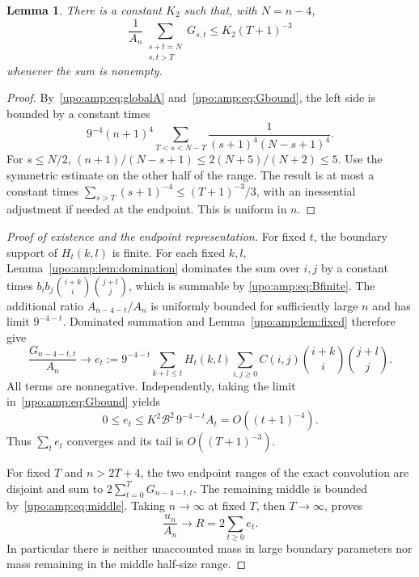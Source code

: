 \documentclass[11pt,letterpaper]{article}
\newtheorem{lemma}[theorem]{Lemma}
\theoremstyle{remark}\newtheorem{remark}[theorem]{Remark}
\numberwithin{equation}{section}
\begin{document}
\begin{lemma}\label{upo:amp:lem:middle}
There is a constant $K_2$ such that, with $N=n-4$,
\begin{equation}\label{upo:amp:eq:middle}
\frac1{A_n}\sum_{\substack{s+t=N\\s,t>T}}G_{s,t}
\le K_2(T+1)^{-3}
\end{equation}
whenever the sum is nonempty.
\end{lemma}
\begin{proof}
By~\eqref{upo:amp:eq:globalA} and~\eqref{upo:amp:eq:Gbound}, the left side is bounded
by a constant times
\[
9^{-4}(n+1)^4\sum_{T<s<N-T}
\frac1{(s+1)^4(N-s+1)^4}.
\]
For $s\le N/2$, $(n+1)/(N-s+1)\le2(N+5)/(N+2)\le5$.
Use the symmetric estimate on the other half of the range. The result
is at most a constant times
$\sum_{s>T}(s+1)^{-4}\le (T+1)^{-3}/3$, with an inessential adjustment
if needed at the endpoint. This is uniform in $n$.
\end{proof}

\begin{proof}[Proof of existence and the endpoint representation]
For fixed $t$, the boundary support of $H_t(k,l)$ is finite. For each
fixed $k,l$, Lemma~\ref{upo:amp:lem:domination} dominates the sum over $i,j$ by
a constant times
$b_ib_j\binom{i+k}{i}\binom{j+l}{j}$, which is summable by
\eqref{upo:amp:eq:Bfinite}. The additional ratio $A_{n-4-t}/A_n$ is uniformly
bounded for sufficiently large $n$ and has limit $9^{-4-t}$.
Dominated summation and Lemma~\ref{upo:amp:lem:fixed} therefore give
\begin{equation}\label{upo:amp:eq:et}
\frac{G_{n-4-t,t}}{A_n}\longrightarrow e_t:=
9^{-4-t}\sum_{k+l\le t}H_t(k,l)
\sum_{i,j\ge0}C(i,j)\binom{i+k}{i}\binom{j+l}{j}.
\end{equation}
All terms are nonnegative. Independently, taking the limit
in~\eqref{upo:amp:eq:Gbound} yields
\[
0\le e_t\le K^2\mathcal B^2\,9^{-4-t}A_t
=O((t+1)^{-4}).
\]
Thus $\sum_te_t$ converges and its tail is $O((T+1)^{-3})$.

For fixed $T$ and $n>2T+4$, the two endpoint ranges of the exact
convolution are disjoint and sum to $2\sum_{t=0}^TG_{n-4-t,t}$.
The remaining middle is bounded by~\eqref{upo:amp:eq:middle}.
Taking $n\to\infty$ at fixed $T$, then $T\to\infty$, proves
\begin{equation}\label{upo:amp:eq:Rend}
\frac{u_n}{A_n}\longrightarrow R=2\sum_{t\ge0}e_t.
\end{equation}
In particular there is neither unaccounted mass in large boundary
parameters nor mass remaining in the middle half-size range.
\end{proof}
\end{document}
